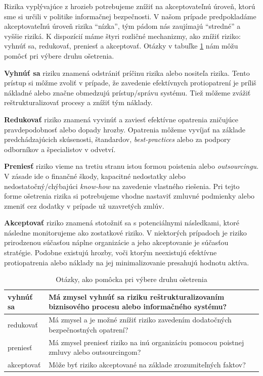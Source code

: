 Rizika vyplývajúce z hrozieb potrebujeme znížiť na akceptovateľnú úroveň, ktorú sme si určili v politike informačnej bezpečnosti. V našom prípade
predpokladáme akceptovateľnú úroveň rizika \enquote{nízka}, tým pádom nás zaujímajú \enquote{stredné} a vyššie riziká. K dispozícií máme štyri
rozličné mechanizmy, ako znížiť riziko: vyhnúť sa, redukovať, preniesť a akceptovať. Otázky v tabuľke \ref{tab:trmqst} nám môžu pomôcť pri výbere
druhu ošetrenia. 

\textbf{Vyhnúť sa} riziku znamená odstrániť príčinu rizika alebo nositeľa rizika. Tento prístup si môžme zvoliť v prípade, že zavedenie efektívnych
protiopatrení je príliš nákladné alebo značne obmedzujú prístup/správu systému. Tiež môžeme zvážiť reštrukturalizovať procesy a znížiť tým náklady.

\textbf{Redukovať} riziko znamená vyvinúť a zaviesť efektívne opatrenia zničujúce pravdepodobnosť alebo dopady hrozby. Opatrenia môžeme vyvíjať
na základe predchádzajúcich skúsenosti, štandardov, \emph{best-practices} alebo za podpory odborníkov a špecialistov v odvetví.

\textbf{Preniesť} riziko vieme na tretiu stranu istou formou poistenia alebo \emph{outsourcingu}. V zásade ide o finančné škody, kapacitné nedostatky
alebo nedostatočný/chýbajúci \emph{know-how} na zavedenie vlastného riešenia. Pri tejto forme ošetrenia rizika si potrebujeme vhodne nastaviť zmluvné
podmienky alebo zmeniť cez dodatky v prípade už uzavretých zmlúv.


\textbf{Akceptovať} riziko znamená stotožniť sa s potenciálnymi následkami, ktoré následne monitorujeme ako zostatkové riziko. V niektorých prípadoch
je riziko prirodzenou súčasťou náplne organizácie a jeho akceptovanie je súčasťou stratégie. Podobne existujú hrozby, voči ktorým neexistujú efektívne
protiopatrenia alebo náklady na jej minimalizovanie presahujú hodnotu aktíva.



\begin{table}[h!]
    \caption{Otázky, ako pomôcka pri výbere druhu ošetrenia}
    \label{tab:trmqst}
    \begin{center}
        \footnotesize
        \begin{tabularx}{\textwidth}{|l|X|}
        \hline
        vyhnúť sa & Má zmysel vyhnúť sa riziku reštrukturalizovaním biznisového procesu alebo informačného systému?
        \\
        \hline
        redukovať & Má zmysel a je možné znížiť riziko zavedením dodatočných bezpečnostných opatrení?
        \\
        \hline
        preniesť & Má zmysel preniesť riziko na inú organizáciu pomocou poistnej zmluvy alebo outsourcingom?
        \\
        \hline
        akceptovať & Môže byť riziko akceptované na základe zrozumiteľných faktov?
        \\
        \hline
        \end{tabularx}
    \end{center}
\end{table}

